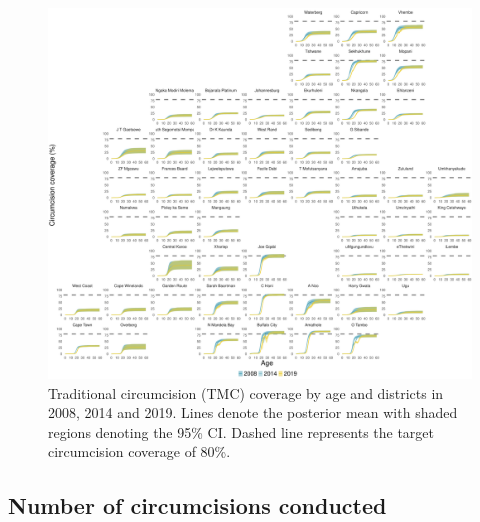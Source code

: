 \documentclass{article}
\begin{document}
\begin{appendix}
\begin{figure}[H]
	\centering
	\includegraphics[width = \linewidth]{Figures/suppmat/Coverage/TMCcoverage_SingleAge_District.pdf}
	\caption{Traditional circumcision (TMC) coverage by age and districts in 2008, 2014 and 2019. Lines denote the posterior mean with shaded regions denoting the 95\% CI. Dashed line represents the target circumcision coverage of 80\%.}
\end{figure}	



\subsection{Number of circumcisions conducted}



\end{appendix}
\end{document}
